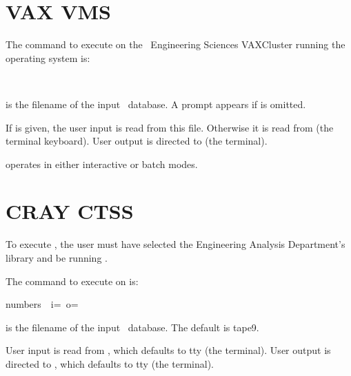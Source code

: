 
\section{VAX VMS}

The command to execute \caps{\numbers} on the \SNL\ Engineering Sciences VAXCluster
running the  operating system is:
\begin{center}
\ \ 
\end{center}

 is the filename of the input \exo\
database. A prompt appears if  is omitted.

If  is given, the user input is read from this
file. Otherwise it is read from \caps{SYS\$INPUT} (the terminal
keyboard). User output is directed to  (the terminal).

\caps{\numbers} operates in either interactive or batch modes.

\section{CRAY CTSS}

To execute \caps{\numbers}, the user must have selected the Engineering
Analysis Department's \cmd{acclib} library and be running \cmd{ccl}.

The command to execute \caps{\numbers} on  is:
\begin{center}
\sf numbers\ \ i=\ o=
\end{center}

 is the filename of the input \exo\
database. The default is {\sf tape9}.

User input is read from , which defaults to {\sf tty} (the
terminal). User output is directed to , which defaults to
{\sf tty} (the terminal).

